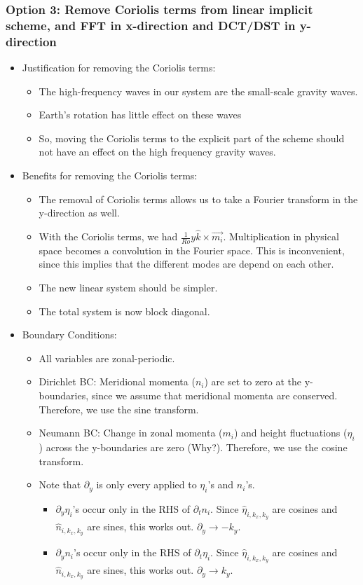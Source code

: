 \documentclass[10pt]{article}
\newcommand{\pd}[1]{\partial_{#1}}
\begin{document}
\subsubsection{Option 3: Remove Coriolis terms from linear implicit scheme, and FFT in x-direction and DCT/DST in y-direction}
\begin{itemize}
	\item Justification for removing the Coriolis terms:
	\begin{itemize}
		\item The high-frequency waves in our system are the small-scale gravity waves.
		\item Earth's rotation has little effect on these waves
		\item So, moving the Coriolis terms to the explicit part of the scheme should not have an effect on the high frequency gravity waves.
	\end{itemize}
	\item Benefits for removing the Coriolis terms:
	\begin{itemize}
		\item The removal of Coriolis terms allows us to take a Fourier transform in the y-direction as well.
		\item With the Coriolis terms, we had $\frac{1}{Ro}y\hat{k}\times \vec{m_i}$. Multiplication in physical space becomes a convolution in the Fourier space. This is inconvenient, since this implies that the different modes are depend on each other. 
		\item The new linear system should be simpler.
		\item The total system is now block diagonal. 
	\end{itemize}
	\item Boundary Conditions:
	\begin{itemize}
		\item All variables are zonal-periodic. 
		\item Dirichlet BC: Meridional momenta ($n_i$) are set to zero at the y-boundaries, since we assume that meridional momenta are conserved. Therefore, we use the sine transform. 
		\item Neumann BC: Change in zonal momenta ($m_i$) and height fluctuations ($\eta_i$) across the y-boundaries are zero {\color{blue}(Why?)}. Therefore, we use the cosine transform. 
		\item Note that $\pd{y}$ is only every applied to $\eta_i$'s and $n_i$'s. 
		\begin{itemize}
			\item $\pd{y}\eta_i$'s occur only in the RHS of $\pd{t}n_i$. Since $\hat{\eta}_{i, k_x, k_y}$ are cosines and $\hat{n}_{i, k_x, k_y}$ are sines, this works out. $\pd{y}\rightarrow -k_y$.
			\item $\pd{y}n_i$'s occur only in the RHS of $\pd{t}\eta_i$. Since $\hat{\eta}_{i, k_x, k_y}$ are cosines and $\hat{n}_{i, k_x, k_y}$ are sines, this works out. $\pd{y}\rightarrow k_y$.
		\end{itemize}
	\end{itemize}
\end{itemize}
\end{document}
